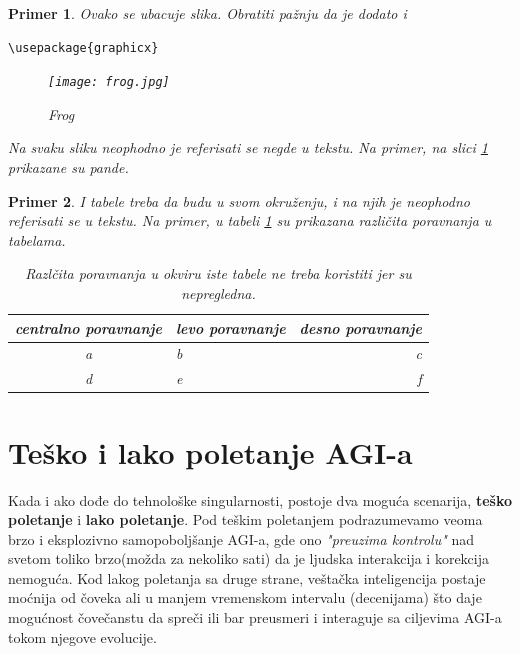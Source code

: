 \documentclass[a4paper]{article}
\newtheorem{primer}{Primer}[section]
\begin{document}
\begin{primer} Ovako se ubacuje slika. Obratiti pažnju da je dodato i 
\begin{verbatim}
\usepackage{graphicx}
\end{verbatim}

\begin{figure}[h!]
\begin{center}
\texttt{[image: frog.jpg]}
\end{center}
\caption{Frog}
\label{fig:frog}
\end{figure}

Na svaku sliku neophodno je referisati se negde u tekstu. Na primer, na slici \ref{fig:frog} prikazane su pande. 
\end{primer}

\begin{primer} I tabele treba da budu u svom okruženju, i na njih je neophodno referisati se u tekstu. Na primer, u tabeli \ref{tab:tabela1} su prikazana različita poravnanja u tabelama.

\begin{table}[h!]
\begin{center}
\caption{Razlčita poravnanja u okviru iste tabele ne treba koristiti jer su nepregledna.}
\begin{tabular}{|c|l|r|} \hline
centralno poravnanje& levo poravnanje& desno poravnanje\\ \hline
a &b&c\\ \hline
d &e&f\\ \hline
\end{tabular}
\label{tab:tabela1}
\end{center}
\end{table}

\end{primer}





\section{Teško i lako poletanje AGI-a}
\label{sec:poletanje}
Kada i ako dođe do tehnološke singularnosti, postoje dva moguća scenarija, \textbf{teško poletanje} i \textbf {lako poletanje}.
Pod teškim poletanjem podrazumevamo veoma brzo i eksplozivno samopoboljšanje AGI-a, gde ono \textit{"preuzima kontrolu"} nad svetom toliko brzo(možda za nekoliko sati) da je ljudska interakcija i korekcija nemoguća. Kod lakog poletanja sa druge strane, veštačka inteligencija postaje moćnija od čoveka ali u manjem vremenskom intervalu (decenijama) što daje mogućnost čovečanstu da spreči ili bar preusmeri i interaguje sa ciljevima AGI-a tokom njegove evolucije.\cite{refe1}
\end{document}
